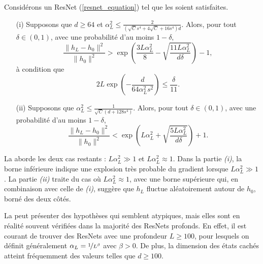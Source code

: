 \begin{proposition}[Admise]\label{prop3}
    Considérons un ResNet (\ref{resnet_equation}) tel que les  soient satisfaites.
    \begin{itemize}
        \item[(i)] Supposons que $ d \geqslant 64 $ et $ \alpha _L ^2 \leqslant  \frac{2}{ (\sqrt{C} s^4 + 4 \sqrt{C} + 16 s ^4) d } $. Alors, pour tout $ \delta \in (0, 1) $, avec une probabilité d'au moins $ 1 - \delta $,
        \[
            \frac{\|h_L - h_0\|^2}{\|h_0\|^2} > \exp\left(\frac{3L\alpha_L^2}{8} - \sqrt{\frac{11L\alpha_L^2}{d\delta}}\right) - 1,
        \]
        à condition que
        \[
            2L \exp\left(-\frac{d}{64\alpha_L^2s^2}\right) \leqslant \frac{\delta}{11}.
        \]
        \item[(ii)] Supposons que $ \alpha_L^2 \leqslant \frac{1}{\sqrt{C}(d + 128s^4)} $. Alors, pour tout $ \delta \in (0, 1)$, avec une probabilité d'au moins $1 - \delta $,
        \[
            \frac{\|h_L - h_0\|^2}{\|h_0\|^2} < \exp\left(L\alpha_L^2 + \sqrt{\frac{5L\alpha_L^2}{d\delta}}\right) + 1.
        \]
    \end{itemize}
\end{proposition}
La  aborde les deux cas restants : $L \alpha_L^2 \gg 1$ et $L \alpha_L^2 \approx 1$. Dans la partie \textit{(i)}, la borne inférieure indique une explosion très probable du gradient lorsque $L \alpha_L^2 \gg 1$. La partie \textit{(ii)} traite du cas où $L \alpha_L^2 \approx 1$, avec une borne supérieure qui, en combinaison avec celle de \textit{(i)}, suggère que $h_L$ fluctue aléatoirement autour de $h_0$, borné des deux côtés.

La  peut présenter des hypothèses qui semblent atypiques, mais elles sont en réalité souvent vérifiées dans la majorité des ResNets profonds. En effet, il est courant de trouver des ResNets avec une profondeur $L \geqslant 100$, pour lesquels on définit généralement $\alpha_L = \nicefrac{1}{L^\beta}$ avec $\beta > 0$. De plus, la dimension des états cachés atteint fréquemment des valeurs telles que $d \geqslant 100$.

